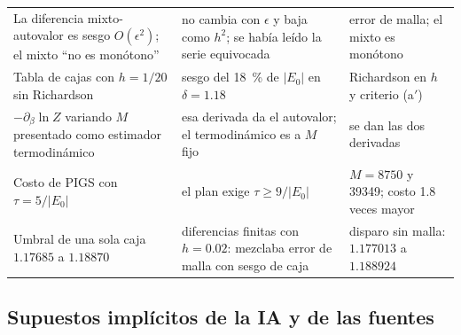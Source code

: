 \documentclass[11pt]{article}
\begin{document}
\begin{longtable}{@{}L{3.6cm}L{5.0cm}L{4.9cm}@{}}
La diferencia mixto-autovalor es sesgo $O(\epsilon^2)$; el mixto ``no es monótono'' & no cambia con $\epsilon$ y baja como $h^2$; se había leído la serie equivocada & error de malla; el mixto es monótono\\
\addlinespace
Tabla de cajas con $h=1/20$ sin Richardson & sesgo del 18~\% de $|E_0|$ en $\delta=1.18$ & Richardson en $h$ y criterio (a$'$)\\
\addlinespace
$-\partial_\beta\ln Z$ variando $M$ presentado como estimador termodinámico & esa derivada da el autovalor; el termodinámico es a $M$ fijo & se dan las dos derivadas\\
\addlinespace
Costo de PIGS con $\tau=5/|E_0|$ & el plan exige $\tau\ge9/|E_0|$ & $M=8750$ y 39349; costo 1.8 veces mayor\\
\addlinespace
Umbral de una sola caja $1.17685$ a $1.18870$ & diferencias finitas con $h=0.02$: mezclaba error de malla con sesgo de caja & disparo sin malla: $1.177013$ a $1.188924$\\
\bottomrule
\end{longtable}

\subsection{Supuestos implícitos de la IA y de las fuentes}
\label{sec:supuestos}
\end{document}

